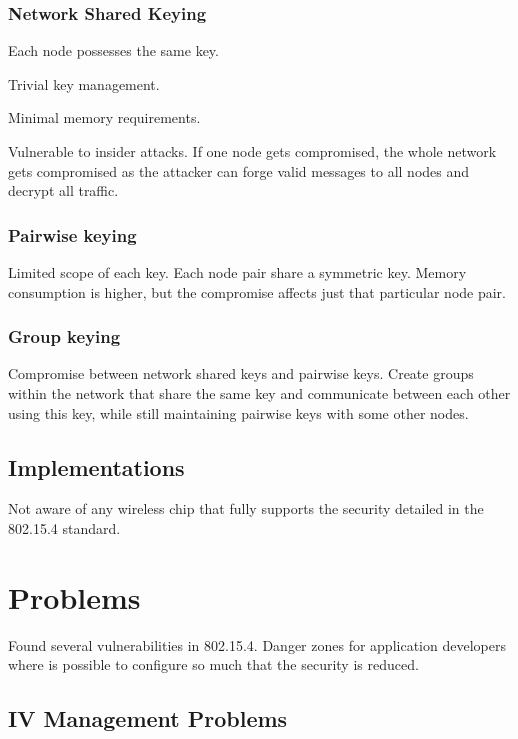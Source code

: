 \documentclass[10pt]{article}
\begin{document}
\subsubsection{Network Shared Keying}

Each node possesses the same key.

Trivial key management.

Minimal memory requirements.

Vulnerable to insider attacks. If one node gets compromised, the whole network gets compromised as the attacker can forge valid messages to all nodes and decrypt all traffic.


\subsubsection{Pairwise keying}


Limited scope of each key. Each node pair share a symmetric key. Memory consumption is higher, but the compromise affects just that particular node pair.


\subsubsection{Group keying}

Compromise between network shared keys and pairwise keys. Create groups within the network that share the same key and communicate between each other using this key, while still maintaining pairwise keys with some other nodes.

\subsection{Implementations}

Not aware of any wireless chip that fully supports the security detailed in the 802.15.4 standard.


\section{Problems}

Found several vulnerabilities in 802.15.4. Danger zones for application developers where is possible to configure so much that the security is reduced.

\subsection{IV Management Problems}
\end{document}
